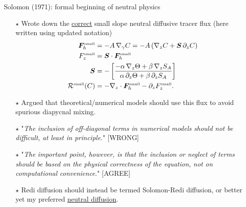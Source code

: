 \documentclass{beamer}
\begin{document}
\begin{frame}{Solomon (1971): formal beginning of neutral physics}

\begin{itemize}
    \item[$\star$] Wrote down the \underline{correct} small slope neutral diffusive tracer flux (here written using updated notation)
\begin{align}
    {\bm F}^{\mbox{\tiny small}}_{h} 
    &= - A \, \nabla_{\gamma} C = -A \, (\nabla_{z} C + {\bm S} \, \partial_{z} C)
    \\
    F_{z}^{\mbox{\tiny small}}
    &= {\bm S} \cdot {\bm F}^{\mbox{\tiny small}}_{h} 
    \\
    {\bm S} &= 
     -\left[ 
      \frac{-\alpha \, \nabla_{z} \Theta + \beta \, \nabla_{z}S_{A}}
      {\alpha \, \partial_{z} \Theta + \beta \, \partial_{z}S_{A} }
      \right]
    \\
     {\cal R}^{\mbox{\tiny small}}(C) 
      &= -\nabla_{z} \cdot {\bm F}_{h}^{\mbox{\tiny small}}
      - \partial_{z} F_{z}^{\mbox{\tiny small}}.
\end{align}

    \item[$\star$] Argued that theoretical/numerical models should use this flux to avoid spurious diapycnal mixing.   
    
     \item[$\star$] "{\it The inclusion of off-diagonal terms in numerical models should not be difficult, at least in principle.}" [WRONG] 
     
     \item[$\star$] "{\it The important point, however, is that the inclusion or neglect of terms should be based on the physical correctness of the equation, not on computational convenience.}" [AGREE]
     
     \item[$\star$] Redi diffusion should instead be termed Solomon-Redi diffusion, or better yet my preferred \underline{neutral diffusion}.
      
\end{itemize}

\end{frame}
\end{document}
